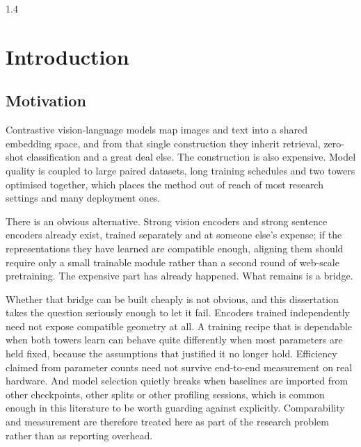 \documentclass[11pt,a4paper,oneside]{report}
\begin{document}
\clearpage
\newpage
{}
\begin{spacing}{1.4}
\listoftables
\end{spacing}

\newpage
{}

\pagestyle{fancyplain}
\renewcommand{\headrulewidth}{0pt}
\renewcommand{\footrulewidth}{0pt}



\chapter{Introduction}
\section{Motivation}
Contrastive vision-language models map images and text into a shared embedding space, and from that single construction they inherit retrieval, zero-shot classification and a great deal else. The construction is also expensive. Model quality is coupled to large paired datasets, long training schedules and two towers optimised together, which places the method out of reach of most research settings and many deployment ones.

There is an obvious alternative. Strong vision encoders and strong sentence encoders already exist, trained separately and at someone else's expense; if the representations they have learned are compatible enough, aligning them should require only a small trainable module rather than a second round of web-scale pretraining. The expensive part has already happened. What remains is a bridge.

Whether that bridge can be built cheaply is not obvious, and this dissertation takes the question seriously enough to let it fail. Encoders trained independently need not expose compatible geometry at all. A training recipe that is dependable when both towers learn can behave quite differently when most parameters are held fixed, because the assumptions that justified it no longer hold. Efficiency claimed from parameter counts need not survive end-to-end measurement on real hardware. And model selection quietly breaks when baselines are imported from other checkpoints, other splits or other profiling sessions, which is common enough in this literature to be worth guarding against explicitly. Comparability and measurement are therefore treated here as part of the research problem rather than as reporting overhead.
\end{document}
